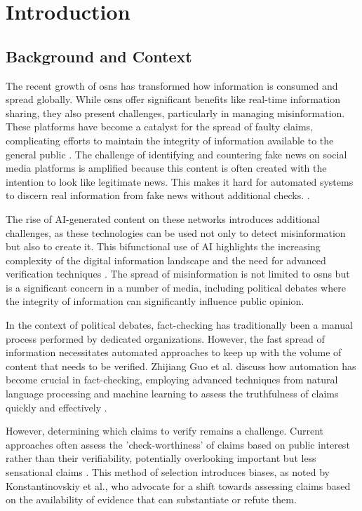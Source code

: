 \newpage
\section{Introduction}
\subsection{Background and Context}

The recent growth of \glspl{osn} has transformed how information is consumed and spread globally. While \glspl{osn} offer significant benefits like real-time information sharing, they also present challenges, particularly in managing misinformation. These platforms have become a catalyst for the spread of faulty claims, complicating efforts to maintain the integrity of information available to the general public
\cite{esmadisinformation2023}. The challenge of identifying and countering fake news on social media platforms is amplified because this content is often created with the intention to look like legitimate news. This makes it hard for automated systems to discern real information from fake news without additional checks. \cite{esmadisinformation2023}.

The rise of AI-generated content on these networks introduces additional challenges, as these technologies can be used not only to detect misinformation but also to create it. This bifunctional use of AI highlights the increasing complexity of the digital information landscape and the need for advanced verification techniques \cite{esmadisinformation2023}. The spread of misinformation is not limited to \glspl{osn} but is a significant concern in a number of media, including political debates where the integrity of information can significantly influence public opinion.

In the context of political debates, fact-checking has traditionally been a manual process performed by dedicated organizations. However, the fast spread of information necessitates automated approaches to keep up with the volume of content that needs to be verified. Zhijiang Guo et al. discuss how automation has become crucial in fact-checking, employing advanced techniques from natural language processing and machine learning to assess the truthfulness of claims quickly and effectively \cite{guo_automated_factcheckingsurvey}.

However, determining which claims to verify remains a challenge. Current approaches often assess the 'check-worthiness' of claims based on public interest rather than their verifiability, potentially overlooking important but less sensational claims \cite{konstantinovskiy}. This method of selection introduces biases, as noted by Konstantinovskiy et al., who advocate for a shift towards assessing claims based on the availability of evidence that can substantiate or refute them.

